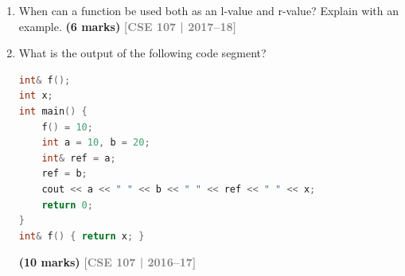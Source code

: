 \documentclass[12pt,a3paper]{article}
\newcommand{\yr}[1]{\hfill\textcolor{gray}{\small\textbf{[#1]}}}
\newcommand{\mk}[1]{\textcolor{orange!70!black}{\small\textbf{(#1 marks)}}}
\begin{document}
\begin{enumerate}
\begin{tcolorbox}[enhanced,breakable,ansbox,colback=cC!4,colframe=cC,
  boxrule=0.8pt,arc=5pt,
  title={\textbf{Answer --- Inline function full details}},
  fonttitle=\bfseries\color{white},colbacktitle=cC]
\textbf{Advantages:}
\begin{itemize}[itemsep=2pt]
  \item Eliminates call overhead (no stack frame, no jump/return).
  \item Enables further compiler optimisations at the call site.
  \item Safer than macros: full type checking, no double-evaluation.
\end{itemize}

\textbf{Disadvantages:}
\begin{itemize}[itemsep=2pt]
  \item \textbf{Code bloat:} the function body is duplicated at every
    call site, increasing binary size.
  \item Increased compilation time.
  \item Changes to the body require recompilation of all includers.
\end{itemize}

\textbf{When to make a function inline:}
\begin{itemize}[itemsep=2pt]
  \item The body is \textbf{small} (1--3 lines) and called very
    frequently.
  \item Simple accessors / getters:
    \texttt{int getX() const \{ return x; \}}
  \item Performance-critical inner loops.
\end{itemize}

\textbf{When the compiler may ignore the specifier:}
\begin{itemize}[itemsep=2pt]
  \item Function contains a loop or \texttt{switch}.
  \item Function is recursive.
  \item Function is too large.
  \item The address of the function is taken.
\end{itemize}

\end{tcolorbox}

\item When can a function be used both as an l-value and r-value? Explain with an example. \mk{6}
\yr{CSE 107 | 2017--18}



\item What is the output of the following code segment?
\begin{lstlisting}[language=C++]
int& f();
int x;
int main() {
    f() = 10;
    int a = 10, b = 20;
    int& ref = a;
    ref = b;
    cout << a << " " << b << " " << ref << " " << x;
    return 0;
}
int& f() { return x; }
\end{lstlisting}
\mk{10}
\yr{CSE 107 | 2016--17}



\end{enumerate}
\end{document}
